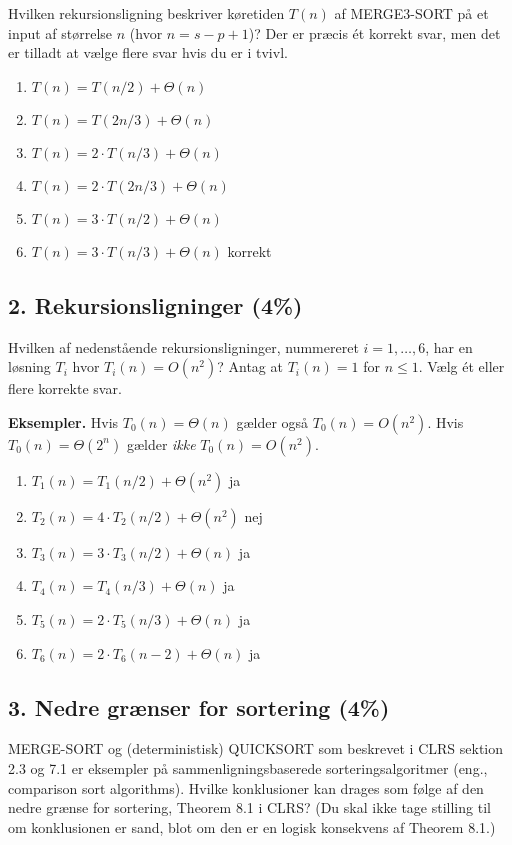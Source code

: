 \documentclass{article}
\theoremstyle{definition}
\begin{document}
Hvilken rekursionsligning beskriver køretiden $T(n)$ af MERGE3-SORT på et input af størrelse $n$ (hvor $n = s - p + 1$)? Der er præcis ét korrekt svar, men det er tilladt at vælge flere svar hvis du er i tvivl.

\begin{enumerate}
    \item $T(n) = T(n/2) + \Theta(n)$
    \item $T(n) = T(2n/3) + \Theta(n)$
    \item $T(n) = 2 \cdot T(n/3) + \Theta(n)$
    \item $T(n) = 2 \cdot T(2n/3) + \Theta(n)$
    \item $T(n) = 3 \cdot T(n/2) + \Theta(n)$
    \item $T(n) = 3 \cdot T(n/3) + \Theta(n)$ korrekt
\end{enumerate}

\subsection{2. Rekursionsligninger (4\%)}
Hvilken af nedenstående rekursionsligninger, nummereret $i = 1,\ldots,6$, har en løsning $T_i$ hvor $T_i(n) = O(n^2)$? Antag at $T_i(n) = 1$ for $n \leq 1$. Vælg ét eller flere korrekte svar.

\textbf{Eksempler.} Hvis $T_0(n) = \Theta(n)$ gælder også $T_0(n) = O(n^2)$. Hvis $T_0(n) = \Theta(2^n)$ gælder \textit{ikke} $T_0(n) = O(n^2)$.

\begin{enumerate}
    \item $T_1(n) = T_1(n/2) + \Theta(n^2)$ ja
    \item $T_2(n) = 4 \cdot T_2(n/2) + \Theta(n^2)$ nej
    \item $T_3(n) = 3 \cdot T_3(n/2) + \Theta(n)$  ja
    \item $T_4(n) = T_4(n/3) + \Theta(n)$ ja
    \item $T_5(n) = 2 \cdot T_5(n/3) + \Theta(n)$ ja
    \item $T_6(n) = 2 \cdot T_6(n-2) + \Theta(n)$ ja
\end{enumerate}

\subsection{3. Nedre grænser for sortering (4\%)}
MERGE-SORT og (deterministisk) QUICKSORT som beskrevet i CLRS sektion 2.3 og 7.1 er eksempler på sammenligningsbaserede sorteringsalgoritmer (eng., comparison sort algorithms). Hvilke konklusioner kan drages som følge af den nedre grænse for sortering, Theorem 8.1 i CLRS? (Du skal ikke tage stilling til om konklusionen er sand, blot om den er en logisk konsekvens af Theorem 8.1.)
\end{document}
